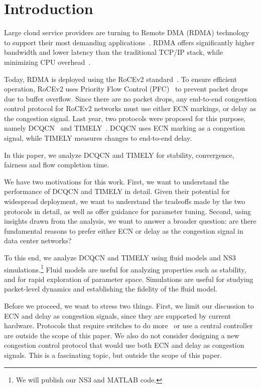 \section{Introduction}

Large cloud service providers are turning to Remote DMA (RDMA) technology to
support their most demanding applications~\cite{dcqcn,timely,tcp-bolt}.  RDMA
offers significantly higher bandwidth and lower latency than the traditional
TCP/IP stack, while minimizing CPU overhead~\cite{dcqcn,farm,timely}. 

Today, RDMA is deployed using the RoCEv2 standard~\cite{rocev2}. To ensure
efficient operation, RoCEv2 uses Priority Flow Control (PFC)~\cite{pfc} to
prevent packet drops due to buffer overflow.  Since there are no packet drops,
any end-to-end congestion control protocol for RoCEv2 networks must use either
ECN markings, or delay as the congestion signal.  Last year, two protocols were
proposed for this purpose, namely DCQCN~\cite{dcqcn} and TIMELY~\cite{timely}.
DCQCN uses ECN marking as a congestion signal, while TIMELY measures changes to
end-to-end delay.


In this paper, we analyze DCQCN and TIMELY for stability, convergence,
fairness and flow completion time.

We have two motivations for this work. First, we want to understand the
performance of DCQCN and TIMELY in detail. Given their potential for widespread
deployment, we want to understand the tradeoffs made by the two protocols in
detail, as well as offer guidance for parameter tuning.  Second, using insights
drawn from the analysis, we want to answer a broader question: are there
fundamental reasons to prefer either ECN or delay as the congestion signal in
data center networks? 


To this end, we analyze DCQCN and TIMELY using fluid models and NS3~\cite{NS3}
simulations.\footnote{We will publish our NS3 and MATLAB code.} Fluid models are
useful for analyzing properties such as stability, and for rapid exploration of
parameter space.  Simulations are useful for studying packet-level dynamics and
establishing the fidelity of the fluid model. 


Before we proceed, we want to stress two things.  First, we limit our discussion
to ECN and delay as congestion signals, since they are supported by current
hardware. Protocols that require switches to do
more~\cite{katabi2002congestion,rcp,pfabric} or use a central
controller~\cite{deadline,perry2014fastpass} are outside the scope of this
paper. We also do not consider designing a new congestion control protocol that
would use both ECN and delay as congestion signals. This is a fascinating topic,
but outside the scope of this paper. 

